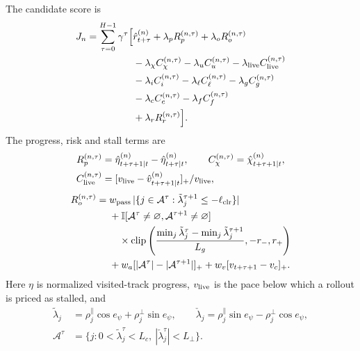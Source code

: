 \documentclass[journal]{IEEEtran}
\begin{document}
The candidate score is
\begin{equation}
\begin{aligned}
 J_n=\sum_{\tau=0}^{H-1}\gamma^\tau\Big[&\hat r_{t+\tau}^{(n)}+\lambda_pR_p^{(n,\tau)}+\lambda_oR_o^{(n,\tau)}\\
 &-\lambda_\chi C_\chi^{(n,\tau)}-\lambda_u C_u^{(n,\tau)}-\lambda_{\rm live}C_{\rm live}^{(n,\tau)}\\
 &-\lambda_i C_i^{(n,\tau)}-\lambda_\ell C_\ell^{(n,\tau)}-\lambda_g C_g^{(n,\tau)}\\
 &-\lambda_c C_c^{(n,\tau)}-\lambda_f C_f^{(n,\tau)}\\
 &+\lambda_r R_r^{(n,\tau)}\Big].
 \end{aligned}
\label{eq:planner_score}
\end{equation}
The progress, risk and stall terms are
\begin{equation}
\begin{aligned}
 R_p^{(n,\tau)}&=\hat\eta_{t+\tau+1|t}^{(n)}-\hat\eta_{t+\tau|t}^{(n)},\qquad
 C_\chi^{(n,\tau)}=\hat\chi_{t+\tau+1|t}^{(n)},\\
 C_{\rm live}^{(n,\tau)}&=[v_{\rm live}-\hat v_{t+\tau+1|t}^{(n)}]_+/v_{\rm live},
\end{aligned}
\end{equation}
\begin{equation}
\begin{aligned}
R_o^{(n,\tau)}={}&w_\mathrm{pass}\,|\{j\in\mathcal A^\tau:\tilde\lambda_j^{\tau+1}\le-\ell_{\rm clr}\}|\\
 &+\mathbb I[\mathcal A^\tau\neq\varnothing,\mathcal A^{\tau+1}\neq\varnothing]\\
 &\quad\times\operatorname{clip}\left(\frac{\min_j\tilde\lambda_j^{\tau}-\min_j\tilde\lambda_j^{\tau+1}}{L_g},-r_-,r_+\right)\\
 &+w_a[|\mathcal A^\tau|-|\mathcal A^{\tau+1}|]_++w_v[v_{t+\tau+1}-v_c]_+.
\end{aligned}
\label{eq:overtaking_reward}
\end{equation}
Here $\eta$ is normalized visited-track progress, $v_{\rm live}$ is the pace
below which a rollout is priced as stalled, and
\begin{equation}
\begin{aligned}
 \tilde\lambda_j&=\rho_j^{\parallel}\cos e_\psi+\rho_j^{\perp}\sin e_\psi,\qquad
 \check\lambda_j=\rho_j^{\parallel}\sin e_\psi-\rho_j^{\perp}\cos e_\psi,\\
 \mathcal A^\tau&=\bigl\{j:0<\tilde\lambda_j^\tau<L_c,\ |\check\lambda_j^\tau|<L_\perp\bigr\}.
\end{aligned}
\label{eq:track_frame_lead}
\end{equation}
\end{document}
